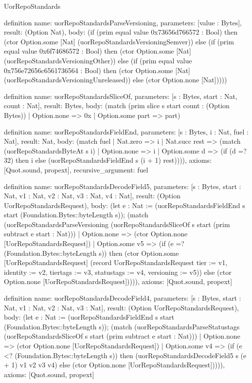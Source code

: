\begin{lexlean}{UorRepoStandards}
\begin{semanticmodule}
definition{
  name: uorRepoStandardsParseVersioning,
  parameters: [value : Bytes],
  result: (Option Nat),
  body: (if (prim equal value 0x73656d766572 : Bool) then (ctor Option.some [Nat] (uorRepoStandardsVersioningSemver)) else (if (prim equal value 0x6f74686572 : Bool) then (ctor Option.some [Nat] (uorRepoStandardsVersioningOther)) else (if (prim equal value 0x756e72656c6561736564 : Bool) then (ctor Option.some [Nat] (uorRepoStandardsVersioningUnreleased)) else (ctor Option.none [Nat]))))
}

definition{
  name: uorRepoStandardsSliceOf,
  parameters: [s : Bytes, start : Nat, count : Nat],
  result: Bytes,
  body: (match (prim slice s start count : (Option Bytes))
    | Option.none => 0x
    | Option.some part => part)
}

definition{
  name: uorRepoStandardsFieldEnd,
  parameters: [s : Bytes, i : Nat, fuel : Nat],
  result: Nat,
  body: (match fuel
    | Nat.zero => i
    | Nat.succ rest => (match (uorRepoStandardsByteAt s i)
      | Option.none => i
      | Option.some d => (if (d =? 32) then i else (uorRepoStandardsFieldEnd s (i + 1) rest)))),
  axioms: [Quot.sound, propext],
  recursive_argument: fuel
}

definition{
  name: uorRepoStandardsDecodeField5,
  parameters: [s : Bytes, start : Nat, v1 : Nat, v2 : Nat, v3 : Nat, v4 : Nat],
  result: (Option UorRepoStandardsRequest),
  body: (let e : Nat := (uorRepoStandardsFieldEnd s start (Foundation.Bytes::byteLength s)); (match (uorRepoStandardsParseVersioning (uorRepoStandardsSliceOf s start (prim subtract e start : Nat)))
    | Option.none => (ctor Option.none [UorRepoStandardsRequest])
    | Option.some v5 => (if (e =? (Foundation.Bytes::byteLength s)) then (ctor Option.some [UorRepoStandardsRequest] (record UorRepoStandardsRequest {tier := v1, identity := v2, tiertags := v3, statustags := v4, versioning := v5})) else (ctor Option.none [UorRepoStandardsRequest])))),
  axioms: [Quot.sound, propext]
}

definition{
  name: uorRepoStandardsDecodeField4,
  parameters: [s : Bytes, start : Nat, v1 : Nat, v2 : Nat, v3 : Nat],
  result: (Option UorRepoStandardsRequest),
  body: (let e : Nat := (uorRepoStandardsFieldEnd s start (Foundation.Bytes::byteLength s)); (match (uorRepoStandardsParseStatustags (uorRepoStandardsSliceOf s start (prim subtract e start : Nat)))
    | Option.none => (ctor Option.none [UorRepoStandardsRequest])
    | Option.some v4 => (if (e <? (Foundation.Bytes::byteLength s)) then (uorRepoStandardsDecodeField5 s (e + 1) v1 v2 v3 v4) else (ctor Option.none [UorRepoStandardsRequest])))),
  axioms: [Quot.sound, propext]
}


\end{semanticmodule}
\end{lexlean}
